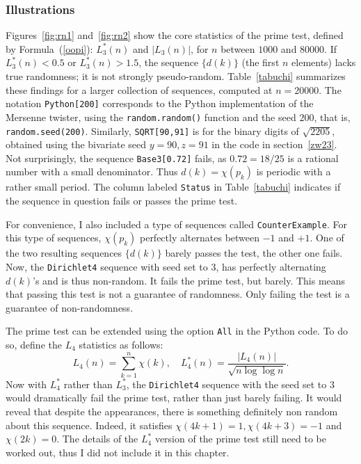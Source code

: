 \documentclass[oneside,10pt]{book}
\begin{document}
\subsubsection{Illustrations}

Figures~\ref{fig:rn1} and~\ref{fig:rn2} show the core statistics of the prime test,
 defined by Formula~(\ref{oopi}): $L^*_3(n)$ and $|L_3(n)|$, for $n$ between
 $\num{1000}$ and $\num{80000}$.  If $L^*_3(n)<0.5$ or $L^*_3(n)>1.5$, the sequence $\{d(k)\}$ (the first $n$ elements) lacks true randomness; it is not
 \textcolor{index}{strongly pseudo-random}. Table~\ref{tabuchi} summarizes these findings for a larger collection of sequences,
 computed at $n=\num{20000}$.
  The notation \texttt{Python[200]} corresponds to the Python implementation
 of the Mersenne twister, using the \texttt{random.random()} function and the seed $200$, that is, \texttt{random.seed(200)}.
 Similarly, \texttt{SQRT[90,91]} is for the binary digits of $\sqrt{2205}$, obtained using the bivariate seed $y=90, z=91$ in the code in section~\ref{zw23}. Not surprisingly, the sequence \texttt{Base3[0.72]} fails, as $0.72=18/25$ is a rational number with a small denominator.
 Thus $d(k)=\chi(p_k)$ is periodic with a rather small period. The column labeled \texttt{Status} in Table~\ref{tabuchi} indicates if the sequence in question fails or passes the prime test.



For convenience, I also included a type of sequences called \texttt{CounterExample}. For this type of sequences, $\chi(p_k)$ perfectly alternates between $-1$ and $+1$. One of the two resulting sequences $\{d(k)\}$ barely passes the test, the other one fails.
Now, the \texttt{Dirichlet4} sequence with seed set to $3$, has perfectly alternating $d(k)$'s and is thus non-random.  It fails the prime test, but barely.
This  means that passing this test is not a guarantee of randomness. Only failing the test is a guarantee of non-randomness.


The prime test can be extended using the option \texttt{All} in the Python code. To do so, define the $L_4$ statistics as follows:
\begin{equation}
L_4(n)=\sum_{k=1}^n \chi(k), \quad L^*_4(n)=\frac{|L_4(n)|}{\sqrt{n\log\log n}}.\label{l4}
\end{equation}
Now with $L^*_4$ rather than $L^*_3$, the \texttt{Dirichlet4} sequence with the seed set to $3$ would dramatically fail the prime test,
 rather than just barely failing. It would reveal that despite the appearances, there is something definitely non random about this sequence. Indeed, it satisfies
$\chi(4k+1)=1, \chi(4k+3)=-1$ and $\chi(2k)=0$.  The details of the $L^*_4$ version of the prime test still need to be worked out, thus I did not include it in this chapter.
\end{document}
